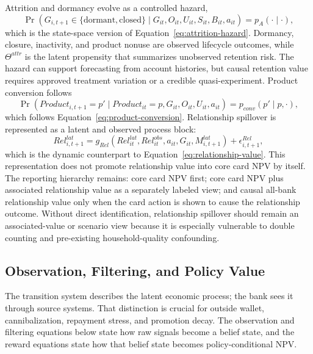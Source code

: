 \documentclass[11pt]{article}
\newcommand{\1}{\mathbf{1}}
\begin{document}
Attrition and dormancy evolve as a controlled hazard,
\begin{equation}
  \Pr(G_{i,t+1}\in\{\mathrm{dormant},\mathrm{closed}\}
  \mid G_{it},O_{it},U_{it},S_{it},B_{it},a_{it})
  = p_A(\cdot\mid\cdot),
  \label{eq:ss-attrition-transition}
\end{equation}
which is the state-space version of Equation~\eqref{eq:attrition-hazard}.
Dormancy, closure, inactivity, and product nonuse are observed lifecycle
outcomes, while $\Theta^{attr}$ is the latent propensity that summarizes
unobserved retention risk. The hazard can support forecasting from account
histories, but causal retention value requires approved treatment variation or
a credible quasi-experiment.
Product conversion follows
\begin{equation}
  \Pr(Product_{i,t+1}=p'\mid Product_{it}=p,G_{it},O_{it},U_{it},a_{it})
  = p_{conv}(p'\mid p,\cdot),
  \label{eq:ss-conversion-transition}
\end{equation}
which follows Equation~\eqref{eq:product-conversion}. Relationship spillover is
represented as a latent and observed process block:
\begin{equation}
  Rel^{lat}_{i,t+1}
  =
  g_{Rel}(Rel^{lat}_{it},Rel^{obs}_{it},a_{it},G_{it},M^{lat}_{i,t+1})
  + \epsilon^{Rel}_{i,t+1},
  \label{eq:ss-relationship-transition}
\end{equation}
which is the dynamic counterpart to Equation~\eqref{eq:relationship-value}.
This representation does not promote relationship value into core card NPV by
itself. The reporting hierarchy remains: core card NPV first; core card NPV
plus associated relationship value as a separately labeled view; and causal
all-bank relationship value only when the card action is shown to cause the
relationship outcome. Without direct identification, relationship spillover
should remain an associated-value or scenario view because it is especially
vulnerable to double counting and pre-existing household-quality confounding.

\subsection{Observation, Filtering, and Policy Value}

The transition system describes the latent economic process; the bank sees it
through source systems. That distinction is crucial for outside wallet,
cannibalization, repayment stress, and promotion decay. The observation and
filtering equations below state how raw signals become a belief state, and the
reward equations state how that belief state becomes policy-conditional NPV.
\end{document}
